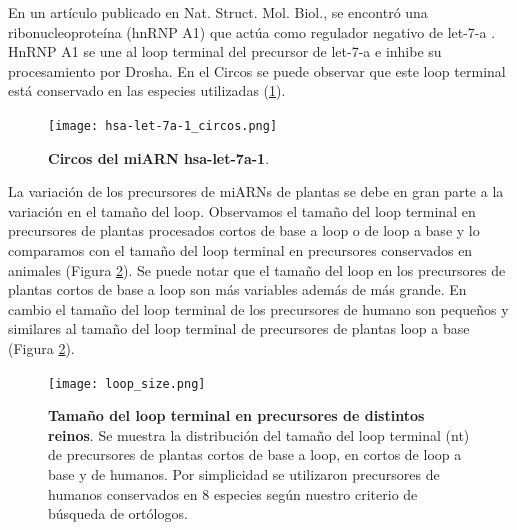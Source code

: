 En un artículo publicado en Nat. Struct. Mol. Biol., se encontró una ribonucleoproteína (hnRNP A1) que actúa como regulador negativo de let-7-a \citep{pmid20639884}.
HnRNP A1 se une al loop terminal del precursor de let-7-a e inhibe su procesamiento por Drosha.
En el Circos se puede observar que este loop terminal está conservado en las especies utilizadas (\ref{fig:hsa-let-7a-1_circos}).

\begin{figure}[htbp!] 
	\centering    
	\texttt{[image: hsa-let-7a-1\_circos.png]}
	\caption[Circos del miARN hsa-let-7a-1]{
		\textbf{Circos del miARN hsa-let-7a-1}.
	}
	\label{fig:hsa-let-7a-1_circos}
\end{figure}


La variación de los precursores de miARNs de plantas se debe en gran parte a la variación en el tamaño del loop.
Observamos el tamaño del loop terminal en precursores de plantas procesados cortos de base a loop o de loop a base y lo comparamos con el tamaño del loop terminal en precursores conservados en animales (Figura \ref{fig:loop_size}).
Se puede notar que el tamaño del loop en los precursores de plantas cortos de base a loop son más variables además de más grande.
En cambio el tamaño del loop terminal de los precursores de humano son pequeños y similares al tamaño del loop terminal de precursores de plantas loop a base (Figura \ref{fig:loop_size}).


\begin{figure}[htbp!] 
	\centering    
	\texttt{[image: loop\_size.png]}
	\caption[Tamaño del loop terminal en precursores de distintos reinos]{
		\textbf{Tamaño del loop terminal en precursores de distintos reinos}.
		Se muestra la distribución del tamaño del loop terminal (nt) de precursores de plantas cortos de base a loop, en cortos de loop a base y de humanos.
		Por simplicidad se utilizaron precursores de humanos conservados en 8 especies según nuestro criterio de búsqueda de ortólogos.
	}
	\label{fig:loop_size}
\end{figure}

